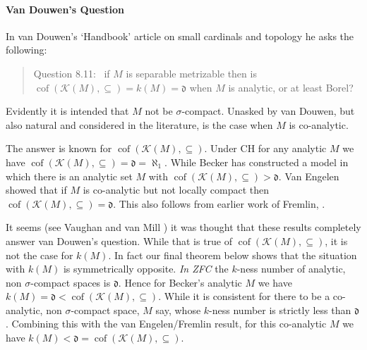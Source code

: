 \documentclass{article}
\newcommand{\K}{\mathcal{K}}
\DeclareMathOperator{\cof}{cof}
\begin{document}
\paragraph{Van Douwen's Question}
In van Douwen's `Handbook' article \cite{vanDou} on small cardinals and topology he  asks the following: 
\begin{quote} Question 8.11: \ 
if $M$ is separable metrizable then is \\ \phantom{x}  $\cof(\K(M),\subseteq)=k(M)=\mathfrak{d}$ when $M$ is analytic, or at least Borel? 
\end{quote}
Evidently it is intended that $M$ not be $\sigma$-compact. 
Unasked by van Douwen, but also natural and considered in the literature, is the case when $M$ is co-analytic.


The answer is known for $\cof(\K(M),\subseteq)$. Under \textsc{CH} for any analytic $M$ we have $\cof(\K(M),\subseteq)=\mathfrak{d}=\aleph_1$. While Becker \cite{Becker} has constructed a model in which there is an analytic set $M$ with $\cof(\K(M),\subseteq)>\mathfrak{d}$. 
Van Engelen \cite{vanEng} showed that if $M$ is co-analytic but not locally compact then $\cof(\K(M),\subseteq) = \mathfrak{d}$. This also follows from earlier work of Fremlin, \cite{Fremlin}. 

It seems (see Vaughan \cite{Vau} and van Mill \cite{vanMill}) it was thought that these results completely answer  van Douwen's question. While that is true of $\cof(\K(M),\subseteq)$, it is not the case for $k(M)$. In fact our final theorem below shows that the situation with $k(M)$ is symmetrically opposite. \emph{In \textsc{ZFC}} the $k$-ness number of analytic, non $\sigma$-compact spaces is $\mathfrak{d}$. Hence for Becker's analytic $M$ we have $k(M)=\mathfrak{d}<\cof(\K(M),\subseteq)$. While it is consistent for there to be a co-analytic, non $\sigma$-compact space, $M$ say, whose $k$-ness number is strictly less than $\mathfrak{d}$. Combining this with the van Engelen/Fremlin result, for this co-analytic $M$ we have $k(M) <\mathfrak{d}=\cof(\K(M),\subseteq)$.  
\end{document}
